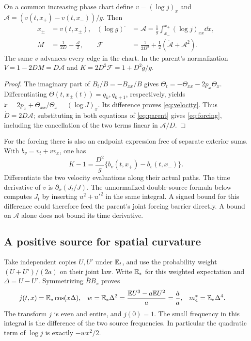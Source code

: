 \begin{theorem}\label{thm:velocity}
On a common increasing phase chart define \(v=(\log j)_x\) and
\(\mathcal A=(v(t,x_+)-v(t,x_-))/g\). Then
\begin{align}
 \dot x_\pm&=v(t,x_\pm),&
 (\log g)^{\displaystyle\cdot}&=\mathcal A
   =\frac1g\int_{x_-}^{x_+}(\log j)_{xx}\dd x, \label{eq:velocity}\\
 M&=\frac1{2D}-\frac{\mathcal A}{2},&
 \mathcal F&=\frac1{2D^2}+\frac12(\dot{\mathcal A}+\mathcal A^2).
 \label{eq:forcing}
\end{align}
The same \(v\) advances every edge in the chart. In the parent's normalization \(V=1-2DM=D\mathcal A\) and \(K=2D^2\mathcal F=1+D^2\ddot g/g\).
\end{theorem}
\begin{proof}
The imaginary part of \(B_t/B=-B_{xx}/B\) gives
\(\Theta_t=-\Theta_{xx}-2p_x\Theta_x\). Differentiating
\(\Theta(t,x_\pm(t))=q_{k},q_{k+1}\), respectively, yields
\(\dot x=2p_x+\Theta_{xx}/\Theta_x=(\log J)_x\). Its difference proves \eqref{eq:velocity}. Thus \(\dot D=2D\mathcal A\); substituting in both equations of \eqref{eq:parent} gives \eqref{eq:forcing}, including the cancellation of the two terms linear in \(\mathcal A/D\).
\end{proof}
For the forcing there is also an endpoint expression free of separate exterior sums. With \(b_v=v_t+v v_x\), one has
\begin{equation}
 K-1=\frac{D^2}{g}\{b_v(t,x_+)-b_v(t,x_-)\}.
 \label{eq:acceleration}
\end{equation}
Differentiate the two velocity evaluations along their actual paths. The time derivative of \(v\) is \(\partial_x(J_t/J)\). The unnormalized double-source formula below computes \(J_t\) by inserting \(u^2+u'^2\) in the same integral. A signed bound for this difference could therefore feed the parent's joint forcing barrier directly. A bound on \(\mathcal A\) alone does not bound its time derivative.

\subsection{A positive source for spatial curvature}
Take independent copies \(U,U'\) under \(\mathbb E_t\), and use the probability weight \((U+U')/(2a)\) on their joint law. Write \(\mathbb E_*\) for this weighted expectation and \(\Delta=U-U'\). Symmetrizing \(\overline B B_x\) proves
\begin{align}
 j(t,x)&=\mathbb E_*\cos(x\Delta),&
 w&=\mathbb E_*\Delta^2
 =\frac{\mathbb E U^3-a\mathbb E U^2}{a}=\frac{\dot a}{a},&
 m_4^*&=\mathbb E_*\Delta^4 . \label{eq:difference}
\end{align}
The transform \(j\) is even and entire, and \(j(0)=1\). The small frequency in this integral is the difference of the two source frequencies. In particular the quadratic term of \(\log j\) is exactly \(-wx^2/2\).


